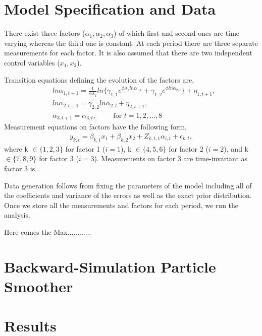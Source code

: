 \documentclass[11pt, a4paper, leqno]{article}
\begin{document}
\section{Model Specification and Data} %
\label{sec:model spefication and data}

There exist three factors ($\alpha_1, \alpha_2, \alpha_3$) of which first and second ones are time varying whereas the third one is constant. At each period there are three separate measurements for each factor. It is also assumed that there are two independent control variables ($x_1, x_2$).  \par 
Transition equations defining the evolution of the factors are,
\begin{align}
& ln\alpha_{1, t+1}  = \displaystyle \frac{1}{\phi \lambda_1} ln \{ \gamma_{1, 1} e^{\phi \lambda_1 ln\alpha_{1, t}} + \gamma_{1, 2}  e^{\phi ln\alpha_{2, t}} \} + \eta_{1, t+1}, \\
& ln\alpha_{2, t+1} = \gamma_{2, 2} ln\alpha_{2, t} + \eta_{2, t+1}, \\
& \alpha_{3,t+1} = \alpha_{3,t}, \hspace{1cm} \text{for $t=1, 2, ..., 8$}
\end{align}
Measurement equations on factors have the following form,
\begin{align*}
y_{k, t} = \beta_{k, 1}x_1 + \beta_{k, 2}x_2 + Z_{k, t, 1}\alpha_{i, t} + \epsilon_{k, t} ,
\end{align*}
where k $\in \{1, 2, 3\}$ for factor 1 ($i=1$), k $\in \{4, 5, 6\}$ for factor 2 ($i=2$), and k $\in \{7, 8, 9\}$ for factor 3 ($i=3$). Measurements on factor 3 are time-invariant as factor 3 is.

Data generation follows from fixing the parameters of the model including all of the coefficients and variance of the errors as well as the exact prior distribution. Once we store all the measurements and factors for each period, we run the analysis.

Here comes the Max............
\section{Backward-Simulation Particle  Smoother}
\label{sec: bakward-simulation particle smoother}

\section{Results}
\label{sec: results}
\end{document}
